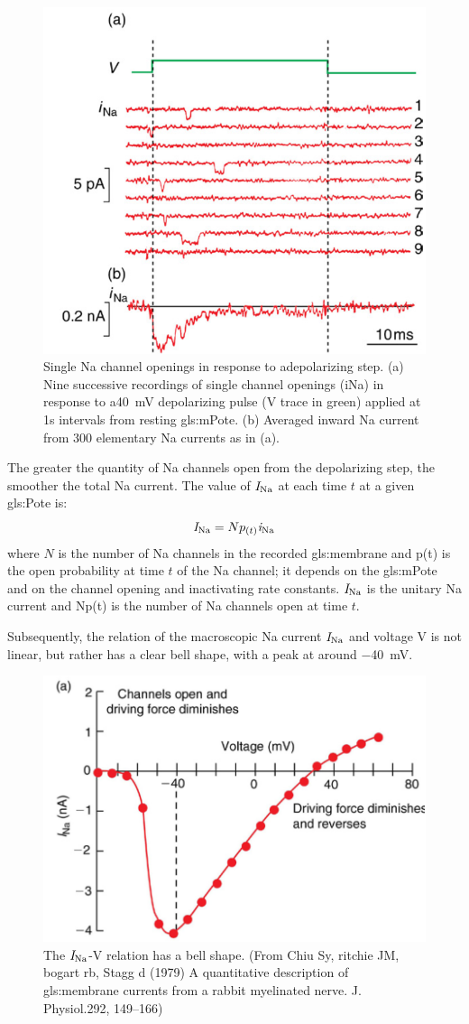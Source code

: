 \documentclass[class={myRUCProject}, crop=false]{standalone}
\begin{document}
\begin{figure}[H]
  \centering
  \includegraphics[width=0.5\linewidth]{Pictures//Anakin/iNa.png}
  \caption{Single \gls{Na} channel openings in response to adepolarizing step. (a) Nine successive recordings of single channel openings (iNa) in response to a\qty{ 40}{\mV} depolarizing pulse (V trace in green) applied at 1s intervals from resting \gls{gls:mPote}. (b) Averaged inward \gls{Na} current from 300 elementary \gls{Na} currents as in (a). }
  \label{fig:unitcurNa}
\end{figure}

The greater the quantity of \gls{Na} channels open from the depolarizing step, the smoother the total \gls{Na} current. The value of \(\mathit{I}_\mathrm{Na}\) at each time \(t\) at a given \gls{gls:Pote} is: 
\begin{equation}
  \mathit{I}_\mathrm{Na}=N p_{(t)} \mathit{i}_\mathrm{Na}
\end{equation}
where \(N\) is the number of \gls{Na} channels in the recorded \gls{gls:membrane} and p(t) is the open probability at time \(t\) of the \gls{Na} channel; it depends on the \gls{gls:mPote} and on the channel opening and inactivating rate constants. \(\mathit{I}_\mathrm{Na}\) is the unitary \gls{Na} current and Np(t) is the number of \gls{Na} channels open at time \(t\). 

Subsequently, the relation of the macroscopic \gls{Na} current \(\mathit{I}_\mathrm{Na}\) and voltage \(\unit{\V}\) is not linear, but rather has a clear bell shape, with a peak at around \qty{-40}{\mV}. 
\begin{figure}[H]
  \centering
  \includegraphics[width=0.5\linewidth]{Pictures//Anakin/I-V.bell.png}
  \caption{The \(\mathit{I}_\mathrm{Na}\)-V relation has a bell shape. (From Chiu Sy, ritchie JM, bogart rb, Stagg d (1979) A quantitative description of \gls{gls:membrane} currents from a rabbit myelinated nerve. J. Physiol.292, 149–166)}\label{fig:enter-label}
\end{figure}
 
\end{document}

